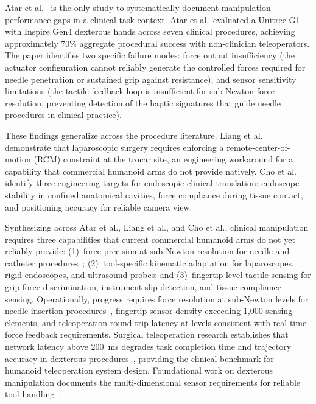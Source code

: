 \documentclass[acmjour]{acmart}
\begin{document}
Atar et al.~\cite{atar2025humanoids} is the only study to systematically document
manipulation performance gaps in a clinical task context. Atar et al.\ evaluated
a Unitree G1 with Inspire Gen4 dexterous hands across seven clinical procedures,
achieving approximately 70\% aggregate procedural success with non-clinician
teleoperators. The paper identifies two specific failure modes: force output
insufficiency (the actuator configuration cannot reliably generate the controlled
forces required for needle penetration or sustained grip against resistance), and
sensor sensitivity limitations (the tactile feedback loop is insufficient for
sub-Newton force resolution, preventing detection of the haptic signatures that
guide needle procedures in clinical practice).

These findings generalize across the procedure literature. Liang et
al.~\cite{liang2025lapsurgie} demonstrate that laparoscopic surgery requires
enforcing a remote-center-of-motion (RCM) constraint at the trocar site, an
engineering workaround for a capability that commercial humanoid arms do not
provide natively. Cho et al.~\cite{cho2026humanoid} identify three engineering
targets for endoscopic clinical translation: endoscope stability in confined
anatomical cavities, force compliance during tissue contact, and positioning
accuracy for reliable camera view.

Synthesizing across Atar et al., Liang et al., and Cho et al., clinical manipulation requires three
capabilities that current commercial humanoid arms do not yet reliably provide:
(1)~force precision at sub-Newton resolution for needle and catheter
procedures~\cite{atar2025humanoids}; (2)~tool-specific kinematic adaptation for
laparoscopes, rigid endoscopes, and ultrasound probes; and (3)~fingertip-level
tactile sensing for grip force discrimination, instrument slip detection, and
tissue compliance sensing. Operationally, progress requires force resolution at
sub-Newton levels for needle insertion procedures~\cite{atar2025humanoids},
fingertip sensor density exceeding 1,000 sensing elements, and teleoperation
round-trip latency at levels consistent with real-time force feedback
requirements. Surgical teleoperation research establishes that network latency
above 200~ms degrades task completion time and trajectory accuracy in
dexterous procedures~\cite{lum2009latency}, providing the clinical benchmark for
humanoid teleoperation system design. Foundational work on dexterous manipulation
documents the multi-dimensional sensor requirements for reliable tool
handling~\cite{okamura2000dexterous}.
\end{document}
